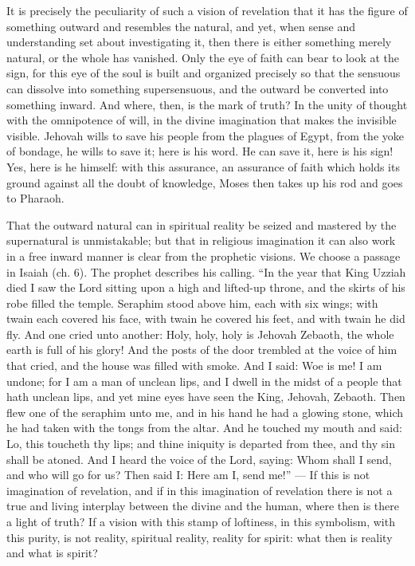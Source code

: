 \documentclass[12pt,a4paper,openany]{book}
\newcommand{\opage}[1]{\marginnote{\footnotesize\textit{[#1]}}}
\begin{document}
It is precisely the peculiarity of such a vision of revelation that it has the figure of something outward and resembles the natural, and yet, when sense and understanding set about investigating it, then there is either something merely natural, or the whole has vanished. Only the eye of faith can bear to look at the sign, for this eye of the soul is built and organized precisely so that the sensuous can dissolve into something supersensuous, and the outward be converted into something inward. And where, then, is the mark of truth? In the unity of thought with the omnipotence of will, in the divine imagination that makes the invisible
\setcounter{footnote}{0}%
\opage{51}visible. Jehovah wills to save his people from the plagues of Egypt, from the yoke of bondage, he wills to save it; here is his word. He can save it, here is his sign! Yes, here is he himself: with this assurance, an assurance of faith which holds its ground against all the doubt of knowledge, Moses then takes up his rod and goes to Pharaoh.

That the outward natural can in spiritual reality be seized and mastered by the supernatural is unmistakable; but that in religious imagination it can also work in a free inward manner is clear from the prophetic visions. We choose a passage in Isaiah (ch. 6). The prophet describes his calling. ``In the year that King Uzziah died I saw the Lord sitting upon a high and lifted-up throne, and the skirts of his robe filled the temple. Seraphim stood above him, each with six wings; with twain each covered his face, with twain he covered his feet, and with twain he did fly. And one cried unto another: Holy, holy, holy is Jehovah Zebaoth, the whole earth is full of his glory! And the posts of the door trembled at the voice of him that cried, and the house was filled with smoke. And I said: Woe is me! I am undone; for I am a man of unclean lips, and I dwell in the midst of a people that hath unclean lips, and yet mine eyes have seen the King, Jehovah, Zebaoth. Then flew one of the seraphim unto me, and in his hand he had a glowing stone, which he had taken with the tongs from the altar. And he touched my mouth and said: Lo, this toucheth thy lips; and thine iniquity is departed from thee, and thy sin shall be atoned. And I heard the voice of the Lord, saying: Whom shall I send, and who will go for us? Then said I: Here am I, send me!'' --- If this is not
\setcounter{footnote}{0}%
\opage{52}imagination of revelation, and if in this imagination of revelation there is not a true and living interplay between the divine and the human, where then is there a light of truth? If a vision with this stamp of loftiness, in this symbolism, with this purity, is not reality, spiritual reality, reality for spirit: what then is reality and what is spirit?
\end{document}
